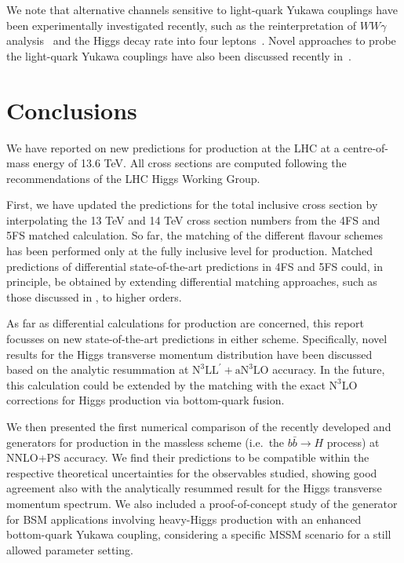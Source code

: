 \documentclass[11pt,a4paper]{article}
\begin{document}
We note that alternative channels sensitive to light-quark Yukawa couplings have been experimentally investigated recently, such as the reinterpretation of $WW\gamma$ analysis~\cite{CMS:2023rcv} and the Higgs decay rate into four leptons~\cite{CMS:2025xkn}. Novel approaches to probe the light-quark Yukawa couplings have also been discussed recently in~.

\section{Conclusions}\label{sec:conclusions}
We have reported on new predictions for \bbH{} production at the LHC at a centre-of-mass energy of 13.6 TeV. All cross sections are computed following the recommendations of the LHC Higgs Working Group.

First, we have updated the predictions for the 
total inclusive cross section by interpolating the 13 TeV and 14 TeV cross section
numbers from the 4FS and 5FS matched \nlonnllpart{} calculation. 
So far, the matching of the different flavour schemes has been performed 
only at the fully inclusive level for \bbH{} production.
Matched predictions of differential state-of-the-art \bbH{} 
predictions in 4FS and 5FS could, in principle, be obtained by 
extending differential matching approaches, such as those 
discussed in , to higher orders.

As far as differential calculations for \bbH{} production are concerned, 
this report focusses on new state-of-the-art predictions in either scheme.
Specifically, novel results for the Higgs transverse momentum distribution 
have been discussed based on the analytic resummation 
at $\text{N}^3\text{LL}^{\prime}+\text{aN}^3\text{LO}$ accuracy. 
In the future, this calculation could be extended by the matching with the 
exact $\text{N}^3\text{LO}$ corrections for Higgs production via 
bottom-quark fusion.

We then presented the first numerical comparison of the recently developed 
\minnlo{} and \GENEVA{} generators for \bbH{} production in the massless scheme
(i.e.\ the $b\bar b \to H$ process) at NNLO+PS accuracy. 
We find their predictions to be compatible within the respective theoretical uncertainties 
for the observables studied, showing good agreement also with the analytically resummed 
result for the Higgs transverse momentum spectrum. 
We also included a proof-of-concept study of the \minnlo{} generator for BSM 
applications involving heavy-Higgs production with an 
enhanced bottom-quark Yukawa coupling, considering a specific MSSM scenario
for a still allowed parameter setting.
\end{document}
